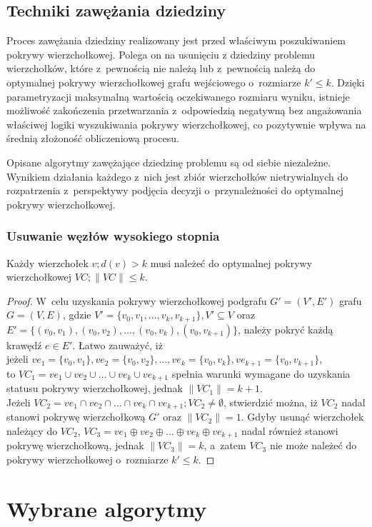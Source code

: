 \section {Techniki zawężania dziedziny}\label{Section_kernelization}

Proces zawężania dziedziny realizowany jest przed właściwym poszukiwaniem
pokrywy wierzchołkowej. Polega on na usunięciu z dziedziny problemu
wierzchołków, które z~pewnością nie należą lub z~pewnością należą do optymalnej
pokrywy wierzchołkowej grafu wejściowego o~rozmiarze $k\prime \leq k$.
Dzięki parametryzacji maksymalną wartością oczekiwanego rozmiaru wyniku,
istnieje możliwość zakończenia przetwarzania z~odpowiedzią negatywną bez
angażowania właściwej logiki wyszukiwania pokrywy wierzchołkowej, co pozytywnie
wpływa na średnią złożoność obliczeniową procesu.

Opisane algorytmy zawężające dziedzinę problemu są od siebie niezależne.
Wynikiem działania każdego z~nich jest zbiór wierzchołków nietrywialnych do
rozpatrzenia z~perspektywy podjęcia decyzji o~przynależności do optymalnej
pokrywy wierzchołkowej.

\subsection {Usuwanie węzłów wysokiego stopnia}\label{section_kernelization_high-degree}

\begin{theorem}
  Każdy wierzchołek $v; d(v) > k $ musi należeć do optymalnej pokrywy wierzchołkowej 
  $VC; \|VC\| \leq k$.
\end{theorem}
\begin{proof}
  W~celu uzyskania pokrywy wierzchołkowej podgrafu $G\prime=(V\prime,E\prime)$
  grafu $G=(V,E)$, gdzie $V\prime=\{v_0, v_1, \ldots, v_k, v_{k+1}\}, V\prime
  \subseteq V$ oraz \\
  $E\prime=\{(v_0,v_1), (v_0,v_2), \ldots, (v_0, v_k), (v_0,v_{k+1})\}$,
  należy pokryć każdą krawędź $e \in E\prime$.
  Łatwo zauważyć, iż \\ jeżeli $ve_1=\{v_0,v_1\}, ve_2=\{v_0,v_2\}, \ldots,
  ve_k=\{v_0,v_k\},ve_{k+1}=\{v_0,v_{k+1}\}$,\\
  to $VC_1=ve_1 \cup ve_2 \cup \ldots \cup ve_k \cup ve_{k+1}$ spełnia warunki 
  wymagane do uzyskania statusu pokrywy wierzchołkowej, jednak $\|VC_1\| = k +1$.\\
  Jeżeli $VC_2=ve_1 \cap ve_2 \cap \ldots \cap ve_k \cap ve_{k+1}; VC_2 \neq \emptyset$,
  stwierdzić można, iż $VC_2$ nadal stanowi pokrywę wierzchołkową $G\prime$ oraz
  $\|VC_2\|=1$.
  Gdyby usunąć wierzchołek należący do $VC_2$, $VC_3=ve_1 \oplus ve_2 \oplus \ldots \oplus ve_k \oplus ve_{k+1}$ nadal
  również stanowi pokrywę wierzchołkową, jednak $\|VC_3\|=k$, a~zatem $VC_3$ nie
  może należeć do pokrywy wierzchołkowej o~rozmiarze $k\prime \leq k$.
\end{proof}

\chapter{Wybrane algorytmy }\label{Chapter_Algorytmy}

